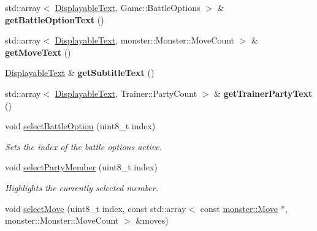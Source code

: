 \begin{DoxyCompactItemize}
\item 
\mbox{\label{classmonsterbattle_1_1DisplayableTextManager_a0e27b8d55979c5150338d96530ce8487}} 
std\+::array$<$ \hyperlink{classmonsterbattle_1_1DisplayableText}{Displayable\+Text}, Game\+::\+Battle\+Options $>$ \& {\bfseries get\+Battle\+Option\+Text} ()
\item 
\mbox{\label{classmonsterbattle_1_1DisplayableTextManager_aa309e11fb3982d648efbdc27f12d37ad}} 
std\+::array$<$ \hyperlink{classmonsterbattle_1_1DisplayableText}{Displayable\+Text}, monster\+::\+Monster\+::\+Move\+Count $>$ \& {\bfseries get\+Move\+Text} ()
\item 
\mbox{\label{classmonsterbattle_1_1DisplayableTextManager_a16a4d1bdaa78de18a86c2aa1380e5eba}} 
\hyperlink{classmonsterbattle_1_1DisplayableText}{Displayable\+Text} \& {\bfseries get\+Subtitle\+Text} ()
\item 
\mbox{\label{classmonsterbattle_1_1DisplayableTextManager_a08fd78c087bdaddd6b9de6a9e95d2bdb}} 
std\+::array$<$ \hyperlink{classmonsterbattle_1_1DisplayableText}{Displayable\+Text}, Trainer\+::\+Party\+Count $>$ \& {\bfseries get\+Trainer\+Party\+Text} ()
\item 
void \hyperlink{classmonsterbattle_1_1DisplayableTextManager_a513b27b56122e391f585effa42c7bb0e}{select\+Battle\+Option} (uint8\+\_\+t index)
\begin{DoxyCompactList}\small\item\em Sets the index of the battle options active. \end{DoxyCompactList}\item 
void \hyperlink{classmonsterbattle_1_1DisplayableTextManager_af5f9f51609ca074cab189375fed1dc73}{select\+Party\+Member} (uint8\+\_\+t index)
\begin{DoxyCompactList}\small\item\em Highlights the currently selected member. \end{DoxyCompactList}\item 
void \hyperlink{classmonsterbattle_1_1DisplayableTextManager_aa041cc5a6f68b4c04456802aff12c50d}{select\+Move} (uint8\+\_\+t index, const std\+::array$<$ const \hyperlink{classmonsterbattle_1_1monster_1_1Move}{monster\+::\+Move} $\ast$, monster\+::\+Monster\+::\+Move\+Count $>$ \&moves)

\end{DoxyCompactItemize}
